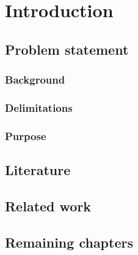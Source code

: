 \chapter{Introduction}
\lipsum[1]

\section{Problem statement}
\lipsum[1]

\subsection{Background}
\subsection{Delimitations}
\subsection{Purpose}

\section{Literature}
\lipsum[1]

\section{Related work}

\section{Remaining chapters}
\lipsum[1]
